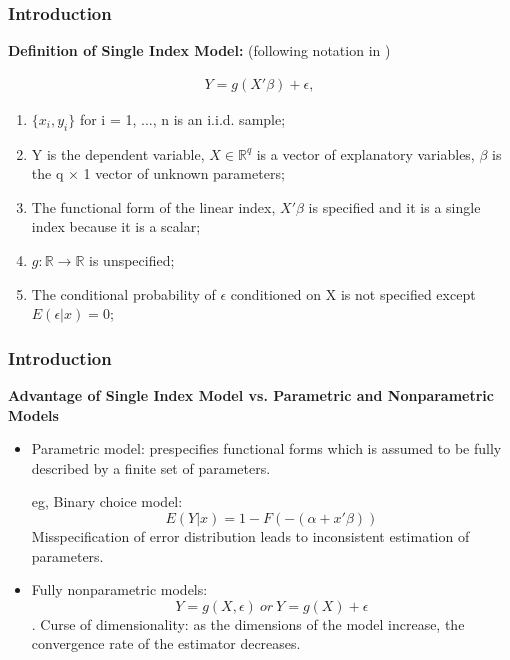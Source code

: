 \documentclass{beamer}
\begin{document}
\begin{frame}[t]
    \frametitle{Introduction}
	 \textbf{Definition of Single Index Model:} 
	 (following notation in \citet{LiRacine07})
 
	 \begin{eqnarray}
		Y = g(X'\beta) + \epsilon,  %
 	 \end{eqnarray}

		\begin{enumerate}
			\item $\{x_i,y_i\}$ for i = 1, ..., n is an i.i.d. sample;
			\item Y is the dependent variable, $X\in \mathbb{R}^{q}$ is a vector of explanatory variables, $\beta$ is the q $\times$ 1 						vector of unknown parameters; 
			\item The functional form of the linear index, $X'\beta$ is specified and it is a single index because it is a scalar;
			\item $g: \mathbb{R} \rightarrow \mathbb{R} $ is unspecified; %
			\item The conditional probability of $\epsilon$ conditioned on X is not specified except $ E(\epsilon|x) = 0 $;
	   \end{enumerate}

\note{~}      
\end{frame}

\begin{frame}[t]
	\frametitle{Introduction}
	\textbf{Advantage of Single Index Model vs. Parametric and Nonparametric Models}
	\begin{itemize}
	\item Parametric model: prespecifies functional forms which is assumed to be fully described by a finite set of parameters.
			
			eg, Binary choice model: 
			\[E(Y|x) = 1 - F(-(\alpha + x'\beta))\]
			Misspecification of error distribution leads to inconsistent estimation of parameters.
			
	\item Fully nonparametric models: \[Y = g(X, \epsilon)\ or\ Y = g(X) + \epsilon\].
	      Curse of dimensionality: as the dimensions of the model increase, the convergence rate of the estimator decreases.
	
	\end{itemize}
	

\note{~}
\end{frame}
\end{document}
